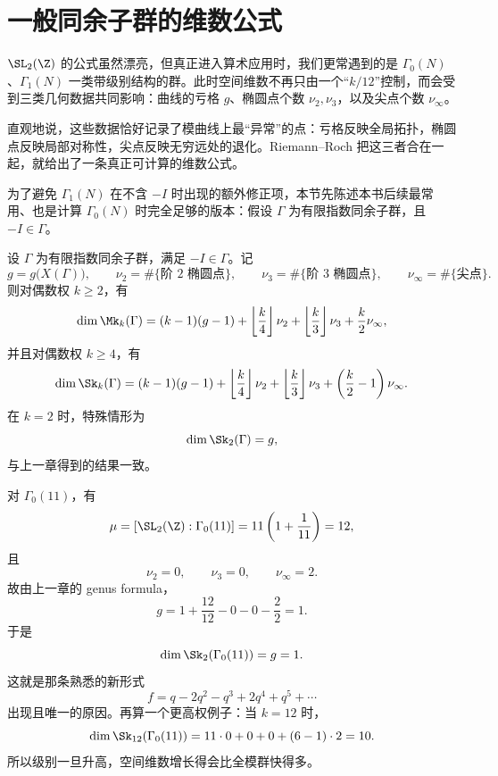 \section{一般同余子群的维数公式}
\label{sec:dim-general}

$\SL_2(\Z)$ 的公式虽然漂亮，但真正进入算术应用时，我们更常遇到的是 $\Gamma_0(N)$、$\Gamma_1(N)$ 一类带级别结构的群。此时空间维数不再只由一个“$k/12$”控制，而会受到三类几何数据共同影响：曲线的亏格 $g$、椭圆点个数 $\nu_2,\nu_3$，以及尖点个数 $\nu_\infty$。

直观地说，这些数据恰好记录了模曲线上最“异常”的点：亏格反映全局拓扑，椭圆点反映局部对称性，尖点反映无穷远处的退化。Riemann--Roch 把这三者合在一起，就给出了一条真正可计算的维数公式。



为了避免 $\Gamma_1(N)$ 在不含 $-I$ 时出现的额外修正项，本节先陈述本书后续最常用、也是计算 $\Gamma_0(N)$ 时完全足够的版本：假设 $\Gamma$ 为有限指数同余子群，且 $-I\in \Gamma$。

\begin{theorem}[一般维数公式]
\label{thm:dim-general}
设 $\Gamma$ 为有限指数同余子群，满足 $-I\in\Gamma$。记
\[
  g=g\bigl(X(\Gamma)\bigr),\qquad \nu_2=\#\{\text{阶 }2\text{ 椭圆点}\},
  \qquad \nu_3=\#\{\text{阶 }3\text{ 椭圆点}\},
  \qquad \nu_\infty=\#\{\text{尖点}\}.
\]
则对偶数权 $k\ge 2$，有
\[
  \dim \Mk_k(\Gamma)
  =(k-1)(g-1)+\left\lfloor\frac{k}{4}\right\rfloor\nu_2
   +\left\lfloor\frac{k}{3}\right\rfloor\nu_3
   +\frac{k}{2}\nu_\infty,
\]
并且对偶数权 $k\ge 4$，有
\[
  \dim \Sk_k(\Gamma)
  =(k-1)(g-1)+\left\lfloor\frac{k}{4}\right\rfloor\nu_2
   +\left\lfloor\frac{k}{3}\right\rfloor\nu_3
   +\left(\frac{k}{2}-1\right)\nu_\infty.
\]
在 $k=2$ 时，特殊情形为
\[
  \dim \Sk_2(\Gamma)=g,
\]
与上一章得到的结果一致。
\end{theorem}

\begin{example}
\label{ex:dim-gamma0-11}
对 $\Gamma_0(11)$，有
\[
  \mu=[\SL_2(\Z):\Gamma_0(11)]=11\left(1+\frac1{11}\right)=12,
\]
且
\[
  \nu_2=0,\qquad \nu_3=0,\qquad \nu_\infty=2.
\]
故由上一章的 genus formula，
\[
  g=1+\frac{12}{12}-0-0-\frac22=1.
\]
于是
\[
  \dim \Sk_2(\Gamma_0(11))=g=1.
\]
这就是那条熟悉的新形式
\[
  f=q-2q^2-q^3+2q^4+q^5+\cdots
\]
出现且唯一的原因。再算一个更高权例子：当 $k=12$ 时，
\[
  \dim \Sk_{12}(\Gamma_0(11))
  =11\cdot 0+0+0+\left(6-1\right)\cdot 2=10.
\]
所以级别一旦升高，空间维数增长得会比全模群快得多。
\end{example}

